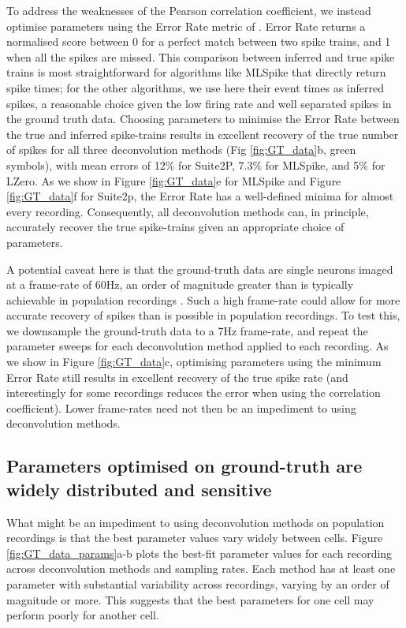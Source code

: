 \documentclass[a4paper,11pt]{article}
\begin{document}
To address the weaknesses of the Pearson correlation coefficient, we instead optimise parameters using the Error Rate metric of \citet{Deneux2016-gu}. Error Rate returns a normalised score between 0 for a perfect match between two spike trains, and 1 when all the spikes are missed. This comparison between inferred and true spike trains is most straightforward for algorithms like MLSpike that directly return spike times; for the other algorithms, we use here their event times as inferred spikes, a reasonable choice given the low firing rate and well separated spikes in the ground truth data. Choosing parameters to minimise the Error Rate between the true and inferred spike-trains results in excellent recovery of the true number of spikes for all three deconvolution methods (Fig \ref{fig:GT_data}b, green symbols), with mean errors of 12$\%$ for Suite2P, 7.3$\%$ for MLSpike, and 5$\%$ for LZero. As we show in Figure \ref{fig:GT_data}e for MLSpike and Figure \ref{fig:GT_data}f for Suite2p, the Error Rate has a well-defined minima for almost every recording. Consequently, all deconvolution methods can, in principle, accurately recover the true spike-trains given an appropriate choice of parameters.

A potential caveat here is that the ground-truth data are single neurons imaged at a frame-rate of 60Hz, an order of magnitude greater than is typically achievable in population recordings \citep{Peron2015-qz}. Such a high frame-rate could allow for more accurate recovery of spikes than is possible in population recordings. To test this, we downsample the ground-truth data to a 7Hz frame-rate, and repeat the parameter sweeps for each deconvolution method applied to each recording. As we show in Figure \ref{fig:GT_data}c, optimising parameters using the minimum Error Rate still results in excellent recovery of the true spike rate (and interestingly for some recordings reduces the error when using the correlation coefficient). Lower frame-rates need not then be an impediment to using deconvolution methods. 

\subsection{Parameters optimised on ground-truth are widely distributed and sensitive}

What might be an impediment to using deconvolution methods on population recordings is that the best parameter values vary widely between cells. Figure \ref{fig:GT_data_params}a-b plots the best-fit parameter values for each recording across deconvolution methods and sampling rates. Each method has at least one parameter with substantial variability across recordings, varying by an order of magnitude or more. This suggests that the best parameters for one cell may perform poorly for another cell.
\end{document}
